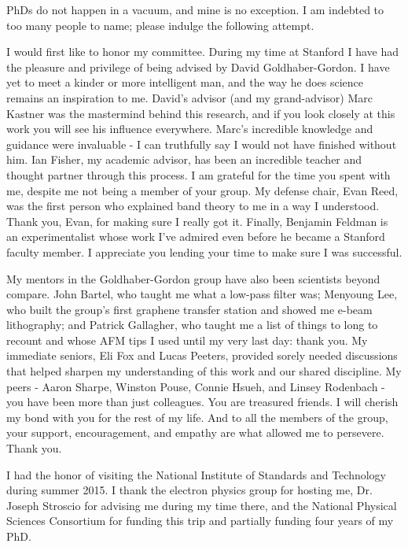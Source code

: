 \documentclass[12pt]{report}
\begin{document}
        PhDs do not happen in a vacuum, and mine is no exception. I am indebted to too many people to name; please indulge the following attempt.
        
        I would first like to honor my committee. During my time at Stanford I have had the pleasure and privilege of being advised by David Goldhaber-Gordon. I have yet to meet a kinder or more intelligent man, and the way he does science remains an inspiration to me. David's advisor (and my grand-advisor) Marc Kastner was the mastermind behind this research, and if you look closely at this work you will see his influence everywhere. Marc's incredible knowledge and guidance were invaluable - I can truthfully say I would not have finished without him. Ian Fisher, my academic advisor, has been an incredible teacher and thought partner through this process. I am grateful for the time you spent with me, despite me not being a member of your group. My defense chair, Evan Reed, was the first person who explained band theory to me in a way I understood. Thank you, Evan, for making sure I really got it. Finally, Benjamin Feldman is an experimentalist whose work I've admired even before he became a Stanford faculty member. I appreciate you lending your time to make sure I was successful.

        My mentors in the Goldhaber-Gordon group have also been scientists beyond compare. John Bartel, who taught me what a low-pass filter was; Menyoung Lee, who built the group's first graphene transfer station and showed me e-beam lithography; and Patrick Gallagher, who taught me a  list of things to long to recount and whose AFM tips I used until my very last day: thank you. My immediate seniors, Eli Fox and Lucas Peeters, provided sorely needed discussions that helped sharpen my understanding of this work and our shared discipline. My peers - Aaron Sharpe, Winston Pouse, Connie Hsueh, and Linsey Rodenbach - you have been more than just colleagues. You are treasured friends. I will cherish my bond with you for the rest of my life. And to all the members of the group, your support, encouragement, and empathy are what allowed me to persevere. Thank you.

        I had the honor of visiting the National Institute of Standards and Technology during summer 2015. I thank the electron physics group for hosting me, Dr. Joseph Stroscio for advising me during my time there, and the National Physical Sciences Consortium for funding this trip and partially funding four years of my PhD.
\end{document}
